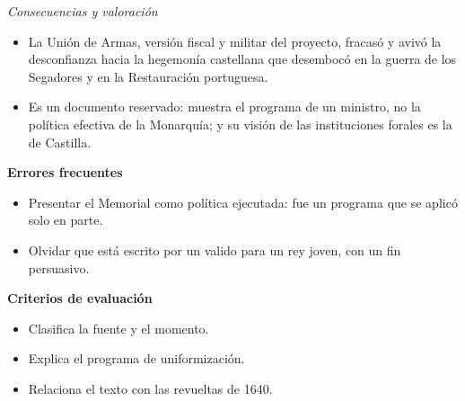 \documentclass{book}
\begin{document}
\begin{tcolorbox}[title={Ejercicio resuelto}, studiumworked, breakable]
\noindent\textit{Consecuencias y valoración}
\begin{itemize}
\item La Unión de Armas, versión fiscal y militar del proyecto, fracasó y avivó la desconfianza hacia la hegemonía castellana que desembocó en la guerra de los Segadores y en la Restauración portuguesa.
\item Es un documento reservado: muestra el programa de un ministro, no la política efectiva de la Monarquía; y su visión de las instituciones forales es la de Castilla.
\end{itemize}

\noindent\textbf{Errores frecuentes}
\begin{itemize}
\item Presentar el Memorial como política ejecutada: fue un programa que se aplicó solo en parte.
\item Olvidar que está escrito por un valido para un rey joven, con un fin persuasivo.
\end{itemize}

\noindent\textbf{Criterios de evaluación}
\begin{itemize}
\item Clasifica la fuente y el momento.
\item Explica el programa de uniformización.
\item Relaciona el texto con las revueltas de 1640.
\end{itemize}
\end{tcolorbox}
\end{document}

